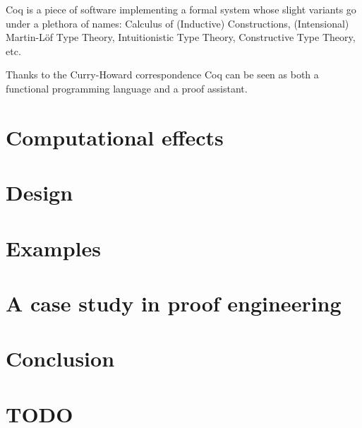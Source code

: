 \documentclass[declaration,inz,english,shortabstract]{iithesis}
\begin{document}
Coq \cite{Coq} is a piece of software implementing a formal system whose slight variants go under a plethora of names: Calculus of (Inductive) Constructions, (Intensional) Martin-L\"of Type Theory, Intuitionistic Type Theory, Constructive Type Theory, etc.

Thanks to the Curry-Howard correspondence \cite{CH} Coq can be seen as both a functional programming language and a proof assistant.



\chapter{Computational effects}

\chapter{Design}

\chapter{Examples}

\chapter{A case study in proof engineering}

\chapter{Conclusion}

\chapter{TODO}
\end{document}
